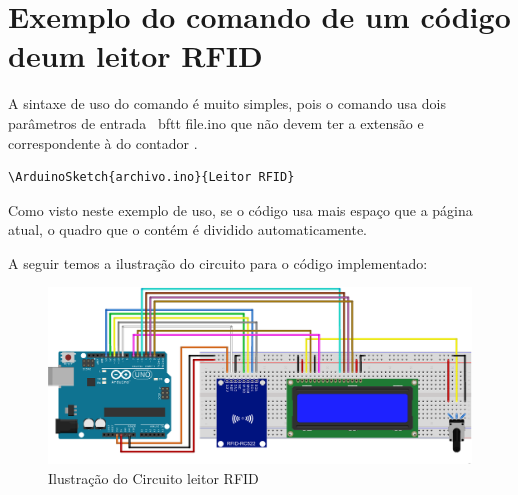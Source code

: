 \documentclass{article}
\begin{document}
\newpage

\section{Exemplo do comando  de um código deum leitor RFID}

A sintaxe de uso do comando  é muito simples, pois o comando usa dois parâmetros de entrada \ bftt {file.ino} que não devem ter a extensão  e  correspondente à  do contador .

\begin{verbatim}
\ArduinoSketch{archivo.ino}{Leitor RFID}
\end{verbatim}

Como visto neste exemplo de uso, se o código usa mais espaço que a página atual, o quadro que o contém é dividido automaticamente.


A seguir temos a ilustração do circuito para o código implementado:

\begin{figure}[htb]
	\centering
	\includegraphics[scale=0.2]{Circuito.png}
	\caption{Ilustração do Circuito leitor RFID}
\end{figure}
\end{document}
